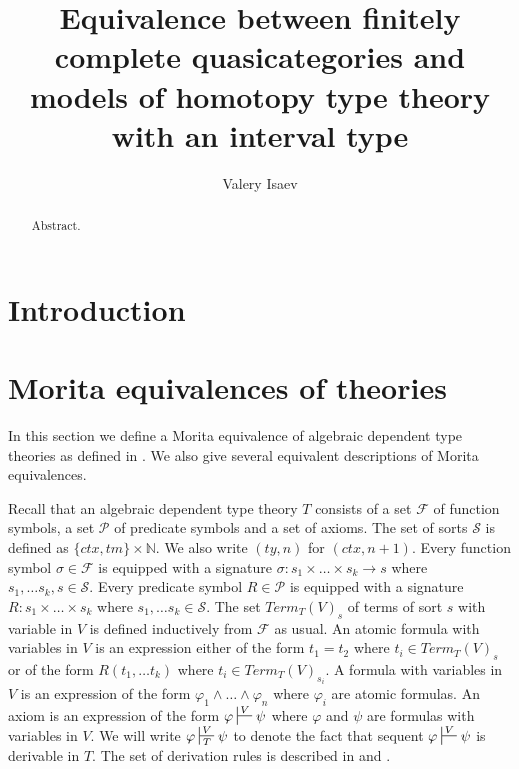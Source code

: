 \documentclass[reqno]{amsart}
\theoremstyle{definition}
\theoremstyle{remark}
\numberwithin{figure}{section}
\begin{document}
\title[Equivalence between quasicategories and models of type theory]{Equivalence between finitely complete quasicategories and models of homotopy type theory with an interval type}

\author{Valery Isaev}

\begin{abstract}
Abstract.
\end{abstract}

\maketitle

\section{Introduction}

\section{Morita equivalences of theories}

In this section we define a Morita equivalence of algebraic dependent type theories as defined in \cite{alg-tt}.
We also give several equivalent descriptions of Morita equivalences.

Recall that an algebraic dependent type theory $T$ consists of a set $\mathcal{F}$ of function symbols, a set $\mathcal{P}$ of predicate symbols and a set of axioms.
The set of sorts $\mathcal{S}$ is defined as $\{ ctx, tm \} \times \mathbb{N}$.
We also write $(ty,n)$ for $(ctx,n+1)$.
Every function symbol $\sigma \in \mathcal{F}$ is equipped with a signature $\sigma : s_1 \times \ldots \times s_k \to s$ where $s_1, \ldots s_k, s \in \mathcal{S}$.
Every predicate symbol $R \in \mathcal{P}$ is equipped with a signature $R : s_1 \times \ldots \times s_k$ where $s_1, \ldots s_k \in \mathcal{S}$.
The set $Term_T(V)_s$ of terms of sort $s$ with variable in $V$ is defined inductively from $\mathcal{F}$ as usual.
An atomic formula with variables in $V$ is an expression either of the form $t_1 = t_2$  where $t_i \in Term_T(V)_s$ or of the form $R(t_1, \ldots t_k)$ where $t_i \in Term_T(V)_{s_i}$.
A formula with variables in $V$ is an expression of the form $\varphi_1 \land \ldots \land \varphi_n$ where $\varphi_i$ are atomic formulas.
An axiom is an expression of the form $\varphi \sststile{}{V} \psi$ where $\varphi$ and $\psi$ are formulas with variables in $V$.
We will write $\varphi \sststile{T}{V} \psi$ to denote the fact that sequent $\varphi \sststile{}{V} \psi$ is derivable in $T$.
The set of derivation rules is described in \cite{PHL} and \cite{alg-tt}.
\end{document}
